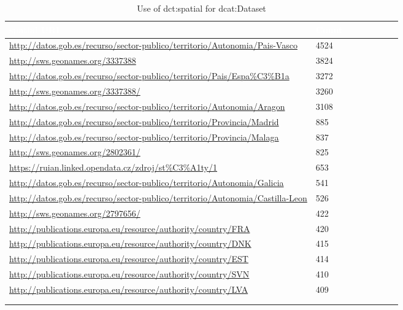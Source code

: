 \documentclass[<options>]{elsarticle}
\begin{document}
\begin{longtable}{*8l}
\rowcolor{blue!90}
\textcolor{white}{\textbf{spatial URI}} & \textcolor{white}{\textbf{Count}} \\ \hline
\rowcolor{gray!10} \url{http://datos.gob.es/recurso/sector-publico/territorio/Autonomia/Pais-Vasco} &4524 \\ \hline
\rowcolor{gray!10} \url{http://sws.geonames.org/3337388} &3824 \\ \hline
\rowcolor{gray!10} \url{http://datos.gob.es/recurso/sector-publico/territorio/Pais/Espa\%C3\%B1a} &3272 \\ \hline
\rowcolor{gray!10} \url{http://sws.geonames.org/3337388/} &3260 \\ \hline
\rowcolor{gray!10} \url{http://datos.gob.es/recurso/sector-publico/territorio/Autonomia/Aragon} &3108 \\ \hline
\rowcolor{gray!10} \url{http://datos.gob.es/recurso/sector-publico/territorio/Provincia/Madrid} &885 \\ \hline
\rowcolor{gray!10} \url{http://datos.gob.es/recurso/sector-publico/territorio/Provincia/Malaga} &837\\ \hline
\rowcolor{gray!10} \url{http://sws.geonames.org/2802361/} &825\\ \hline
\rowcolor{gray!10} \url{https://ruian.linked.opendata.cz/zdroj/st\%C3\%A1ty/1} &653\\ \hline
\rowcolor{gray!10} \url{http://datos.gob.es/recurso/sector-publico/territorio/Autonomia/Galicia} &541\\ \hline
\rowcolor{gray!10} \url{http://datos.gob.es/recurso/sector-publico/territorio/Autonomia/Castilla-Leon } &526\\ \hline
\rowcolor{gray!10} \url{http://sws.geonames.org/2797656/ } &422\\ \hline
\rowcolor{gray!10} \url{http://publications.europa.eu/resource/authority/country/FRA  } &420\\ \hline
\rowcolor{gray!10} \url{http://publications.europa.eu/resource/authority/country/DNK } &415\\ \hline
\rowcolor{gray!10} \url{http://publications.europa.eu/resource/authority/country/EST 	} &414\\ \hline
\rowcolor{gray!10} \url{http://publications.europa.eu/resource/authority/country/SVN } &410\\ \hline
\rowcolor{gray!10} \url{http://publications.europa.eu/resource/authority/country/LVA } &409\\ \hline
\\ 
\caption{Use of dct:spatial for dcat:Dataset}
\end{longtable}
\end{document}
